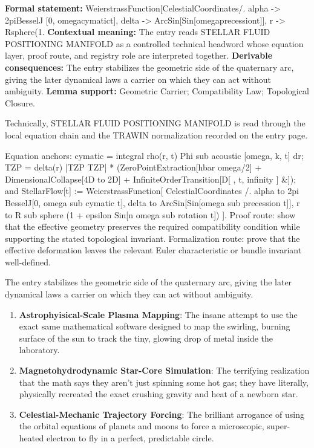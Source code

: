 \begingroup\footnotesize\setlength{\emergencystretch}{3em}\sloppy
\textbf{Formal statement:} WeierstrassFunction[CelestialCoordinates/. alpha -> 2piBesselJ [0, omegacymatict], delta -> ArcSin[Sin[omegaprecessiont]], r -> Rsphere(1. \textbf{Contextual meaning:} The entry reads STELLAR FLUID POSITIONING MANIFOLD as a controlled technical headword whose equation layer, proof route, and registry role are interpreted together. \textbf{Derivable consequences:} The entry stabilizes the geometric side of the quaternary arc, giving the later dynamical laws a carrier on which they can act without ambiguity. \textbf{Lemma support:} Geometric Carrier; Compatibility Law; Topological Closure.\par
\endgroup

Technically, STELLAR FLUID POSITIONING MANIFOLD is read through the local equation chain and the TRAWIN normalization recorded on the entry page.

Equation anchors:  cymatic = integral rho(r, t) Phi sub acoustic [omega, k, t] dr;  TZP = delta(r) |TZP TZP| * (ZeroPointExtraction[hbar omega/2] + DimensionalCollapse[4D to 2D] + InfiniteOrderTransition[D[ , t, infinity ] \&]); and StellarFlow[t] := WeierstrassFunction[ CelestialCoordinates /. alpha to 2pi BesselJ[0, omega sub cymatic t], delta to ArcSin[Sin[omega sub precession t]], r to R sub sphere (1 + epsilon Sin[n omega sub rotation t]) ]. Proof route: show that the effective geometry preserves the required compatibility condition while supporting the stated topological invariant. Formalization route: prove that the effective deformation leaves the relevant Euler characteristic or bundle invariant well-defined.

The entry stabilizes the geometric side of the quaternary arc, giving the later dynamical laws a carrier on which they can act without ambiguity.
\endgroup

\begin{enumerate}[leftmargin=1.6em,itemsep=6pt,topsep=4pt]
\item \textbf{Astrophyisical-Scale Plasma Mapping}: The insane attempt to use the exact same mathematical software designed to map the swirling, burning surface of the sun to track the tiny, glowing drop of metal inside the laboratory.
\item \textbf{Magnetohydrodynamic Star-Core Simulation}: The terrifying realization that the math says they aren't just spinning some hot gas; they have literally, physically recreated the exact crushing gravity and heat of a newborn star.
\item \textbf{Celestial-Mechanic Trajectory Forcing}: The brilliant arrogance of using the orbital equations of planets and moons to force a microscopic, super-heated electron to fly in a perfect, predictable circle.
\end{enumerate}

